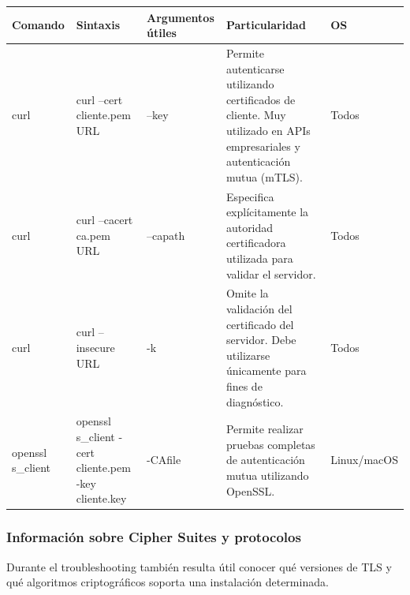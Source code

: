 \documentclass[a4paper,10pt]{article}
\begin{document}
\begin{longtable}{|p{2.8cm}|p{3cm}|p{4cm}|p{5.6cm}|p{1.5cm}|}

\hline
Comando &
Sintaxis &
Argumentos útiles &
Particularidad &
OS
\\
\hline
\endhead

curl &
curl --cert cliente.pem URL &
--key &
Permite autenticarse utilizando certificados de cliente. Muy utilizado en APIs empresariales y autenticación mutua (mTLS). &
Todos
\\
\hline

curl &
curl --cacert ca.pem URL &
--capath &
Especifica explícitamente la autoridad certificadora utilizada para validar el servidor. &
Todos
\\
\hline

curl &
curl --insecure URL &
-k &
Omite la validación del certificado del servidor. Debe utilizarse únicamente para fines de diagnóstico. &
Todos
\\
\hline

openssl s\_client &
openssl s\_client -cert cliente.pem -key cliente.key &
-CAfile &
Permite realizar pruebas completas de autenticación mutua utilizando OpenSSL. &
Linux/macOS
\\
\hline

\end{longtable}



\subsubsection{Información sobre Cipher Suites y protocolos}

Durante el troubleshooting también resulta útil conocer qué versiones de TLS
y qué algoritmos criptográficos soporta una instalación determinada.
\end{document}
